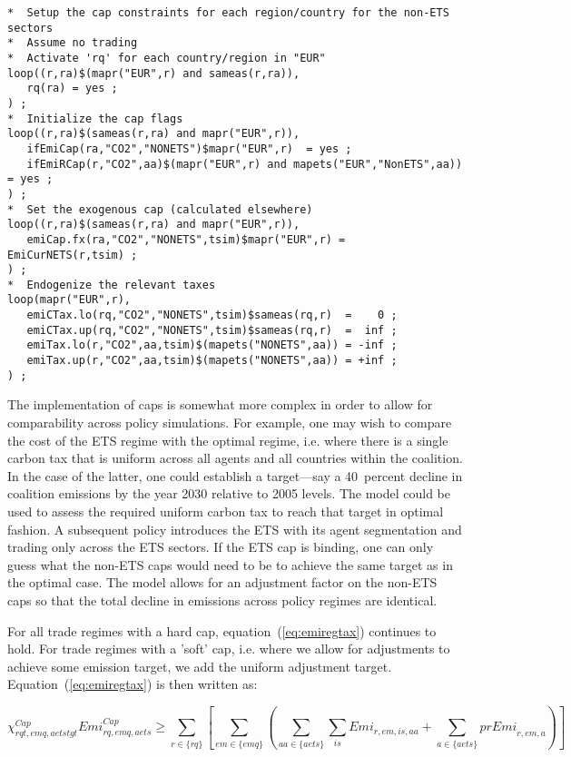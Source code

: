 \documentclass[11pt,letterpaper]{report}
\begin{document}
\begin{lstlisting}[language=GAMS, caption={Example of ETS regime}]
*  Setup the cap constraints for each region/country for the non-ETS sectors
*  Assume no trading
*  Activate 'rq' for each country/region in "EUR"
loop((r,ra)$(mapr("EUR",r) and sameas(r,ra)),
   rq(ra) = yes ;
) ;
*  Initialize the cap flags
loop((r,ra)$(sameas(r,ra) and mapr("EUR",r)),
   ifEmiCap(ra,"CO2","NONETS")$mapr("EUR",r)  = yes ;
   ifEmiRCap(r,"CO2",aa)$(mapr("EUR",r) and mapets("EUR","NonETS",aa)) = yes ;
) ;
*  Set the exogenous cap (calculated elsewhere)
loop((r,ra)$(sameas(r,ra) and mapr("EUR",r)),
   emiCap.fx(ra,"CO2","NONETS",tsim)$mapr("EUR",r) = EmiCurNETS(r,tsim) ;
) ;
*  Endogenize the relevant taxes
loop(mapr("EUR",r),
   emiCTax.lo(rq,"CO2","NONETS",tsim)$sameas(rq,r)  =    0 ;
   emiCTax.up(rq,"CO2","NONETS",tsim)$sameas(rq,r)  =  inf ;
   emiTax.lo(r,"CO2",aa,tsim)$(mapets("NONETS",aa)) = -inf ;
   emiTax.up(r,"CO2",aa,tsim)$(mapets("NONETS",aa)) = +inf ;
) ;
\end{lstlisting}

The implementation of caps is somewhat more complex in order to allow for
comparability across policy simulations. For example, one may wish to compare
the cost of the ETS regime with the optimal regime, i.e. where there is a
single carbon tax that is uniform across all agents and all countries within
the coalition. In the case of the latter, one could establish a target---say
a 40~percent decline in coalition emissions by the year 2030 relative to 2005 levels.
The model could be used to assess the required uniform carbon tax to reach
that target in optimal fashion. A subsequent policy introduces the ETS with
its agent segmentation and trading only across the ETS sectors. If the ETS cap
is binding, one can only guess what the non-ETS caps would need to be to
achieve the same target as in the optimal case. The model allows for an adjustment
factor on the non-ETS caps so that the total decline in emissions across
policy regimes are identical.

For all trade regimes with a hard cap, equation~(\ref{eq:emiregtax}) continues
to hold. For trade regimes with a 'soft' cap, i.e. where we allow for adjustments
to achieve some emission target, we add the uniform adjustment target.
Equation~(\ref{eq:emiregtax}) is then written as:

\begin{equation}
\label{eq:emiregtaxbis}
\chi^{\mathit{Cap}}_{\mathit{rqt},\mathit{emq},\mathit{aetstgt}}
\mathit{Emi}^{\mathit{Cap}}_{\mathit{rq},\mathit{emq},\mathit{aets}}
\ge
\sum_{r \in \{ \mathit{rq}\}}
{\left[
\sum_{\mathit{em} \in \{\mathit{emq}\}}
\left( \sum_{\mathit{aa} \in \{\mathit{aets}\}}
\sum_{\mathit{is}} {\mathit{Emi}_{r,\mathit{em},\mathit{is},\mathit{aa}}}
 +
\sum_{\mathit{a} \in \{\mathit{aets}\}}{\mathit{prEmi}_{r,\mathit{em},a}}
\right)
\right]}
\end{equation}
\end{document}
